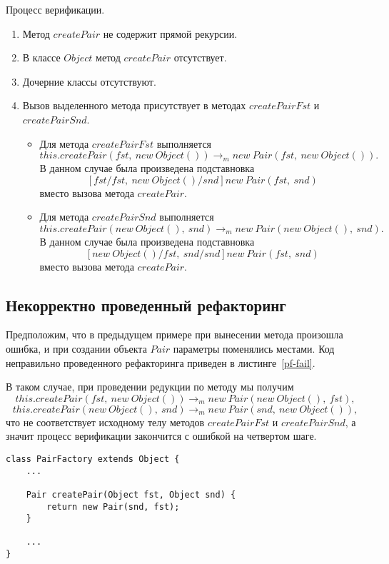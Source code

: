 Процесс верификации.
\begin{enumerate}
    \item Метод $createPair$ не содержит прямой рекурсии.
    \item В классе $Object$ метод $createPair$ отсутствует.
    \item Дочерние классы отсутствуют.
    \item Вызов выделенного метода присутствует в методах $createPairFst$ и $createPairSnd$.
    \begin{itemize}
        \item Для метода $createPairFst$ выполняется
        $$this.createPair(fst,\ new\ Object()) \rightarrow_m new\ Pair(fst,\ new\ Object()).$$
        В данном случае была произведена подставновка
        $$[fst/fst,\ new\ Object()/snd]new\ Pair(fst,\ snd)$$
        вместо вызова метода $createPair$.
        \item Для метода $createPairSnd$ выполняется
        $$this.createPair(new\ Object(),\ snd) \rightarrow_m new\ Pair(new\ Object(),\ snd).$$
        В данном случае была произведена подставновка
        $$[new\ Object()/fst,\ snd/snd]new\ Pair(fst,\ snd)$$
        вместо вызова метода $createPair$.
    \end{itemize}
\end{enumerate}
\subsection{Некорректно проведенный рефакторинг}
Предположим, что в предыдущем примере при вынесении метода произошла ошибка, и при создании объекта $Pair$ параметры поменялись местами.
Код неправильно проведенного рефакторинга приведен в листинге~\ref{pf-fail}.

В таком случае, при проведении редукции по методу мы получим
$$this.createPair(fst,\ new\ Object()) \rightarrow_m new\ Pair(new\ Object(),\ fst),$$
$$this.createPair(new\ Object(),\ snd) \rightarrow_m new\ Pair(snd,\ new\ Object()),$$
что не соответствует исходному телу методов $createPairFst$ и $createPairSnd$,
а значит процесс верификации закончится с ошибкой на четвертом шаге.
\begin{lstlisting}[float,label=pf-fail,caption=Код после ошибочного выделения метода.]
class PairFactory extends Object {
    ...

    Pair createPair(Object fst, Object snd) {
        return new Pair(snd, fst);
    }

    ...
}
\end{lstlisting}

